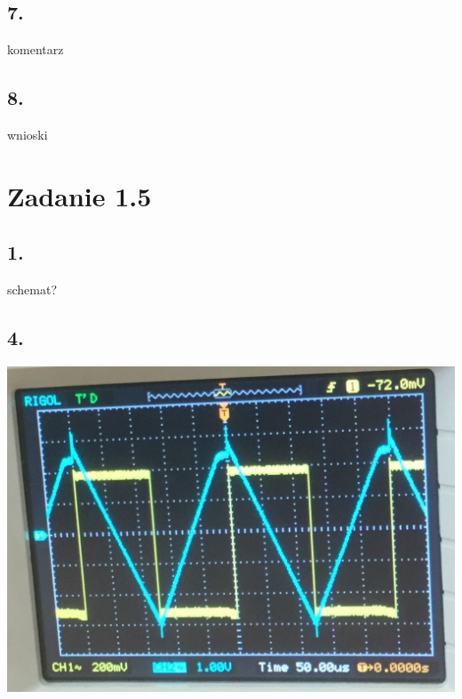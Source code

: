 \documentclass[polish,a4paper]{article}
\begin{document}
\subsection*{7.}
komentarz
\subsection*{8.}
wnioski

\section{Zadanie 1.5}

\subsection*{1.}
schemat?
\subsection*{4.}
\includegraphics[scale=0.5]{przebieg_trojkatny}
\end{document}
